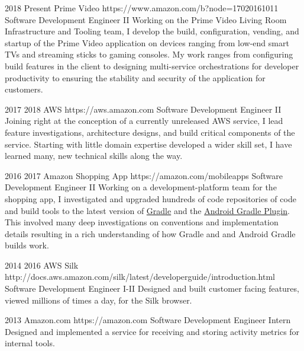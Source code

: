 \job
{2018} {Present}
{Prime Video} {https://www.amazon.com/b?node=17020161011}
{Software Development Engineer II}
{
    Working on the Prime Video Living Room Infrastructure and Tooling team, I develop the build, configuration, vending, and startup of the Prime Video application on devices ranging from low-end smart TVs and streaming sticks to gaming consoles. My work ranges from configuring build features in the client to designing multi-service orchestrations for developer productivity to ensuring the stability and security of the application for customers.
}

\job
{2017} {2018}
{AWS} {https://aws.amazon.com}
{Software Development Engineer II}
{
    Joining right at the conception of a currently unreleased AWS service, I lead feature investigations, architecture designs, and build critical components of the service. Starting with little domain expertise developed a wider skill set, I have learned many, new technical skills along the way.
}

\job
{2016} {2017}
{Amazon Shopping App} {https://amazon.com/mobileapps}
{Software Development Engineer II}
{
    Working on a development-platform team for the shopping app, I investigated and upgraded hundreds of code repositories of code and build tools to the latest version of \href {https://gradle.org} {Gradle} and the \href {https://developer.android.com/studio/build/index.html} {Android Gradle Plugin}. This involved many deep investigations on conventions and implementation details resulting in a rich understanding of how Gradle and and Android Gradle builds work.
}

\job
{2014} {2016}
{AWS Silk} {http://docs.aws.amazon.com/silk/latest/developerguide/introduction.html}
{Software Development Engineer I-II}
{
    Designed and built customer facing features, viewed millions of times a day, for the Silk browser.
}

\job
{2013} {}
{Amazon.com} {https://amazon.com}
{Software Development Engineer Intern}
{
    Designed and implemented a service for receiving and storing activity metrics for internal tools.
}